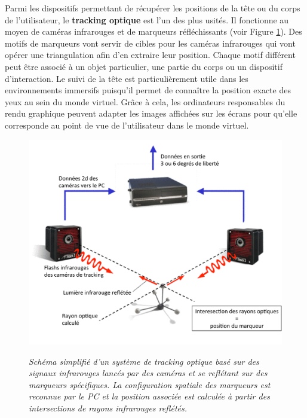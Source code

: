 Parmi les dispositifs permettant de récupérer les positions de la tête ou du corps de l'utilisateur, le \textbf{tracking optique} est l'un des plus usités. Il fonctionne au moyen de caméras infrarouges et de marqueurs réfléchissants (voir Figure \ref{Fig:ir-tracking}). Des motifs de marqueurs vont servir de cibles pour les caméras infrarouges qui vont opérer une triangulation afin d'en extraire leur position. Chaque motif différent peut être associé à un objet particulier, une partie du corps ou un dispositif d'interaction. Le suivi de la tête est particulièrement utile dans les environnements immersifs puisqu'il permet de connaître la position exacte des yeux au sein du monde virtuel. Grâce à cela, les ordinateurs responsables du rendu graphique peuvent adapter les images affichées sur les écrans pour qu'elle corresponde au point de vue de l'utilisateur dans le monde virtuel.

\begin{figure}
  \centering
  {\includegraphics[width=.65\linewidth]{./figures/ch2/IR-tracking}}
    \caption[Schéma simplifié d'un système de tracking optique.]{{\it Schéma simplifié d'un système de tracking optique basé sur des signaux infrarouges lancés par des caméras et se reflétant sur des marqueurs spécifiques. La configuration spatiale des marqueurs est reconnue par le PC et la position associée est calculée à partir des intersections de rayons infrarouges reflétés.}}
  \label{Fig:ir-tracking}
  \hspace{0.3cm}
\end{figure}

